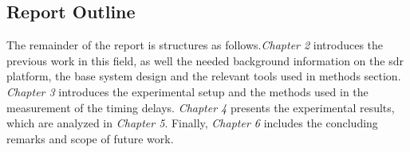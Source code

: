 \subsection{Report Outline}
The remainder of the report is structures as follows.\textit{Chapter 2} introduces the previous work in this field, as well the needed background information on the \ac{sdr} platform, the base system design and the relevant tools used in methods section. \textit{Chapter 3} introduces the experimental setup and the methods used in the measurement of the timing delays. \textit{Chapter 4} presents the experimental results, which are analyzed in \textit{Chapter 5}. Finally, \textit{Chapter 6} includes the concluding remarks and scope of future work.
